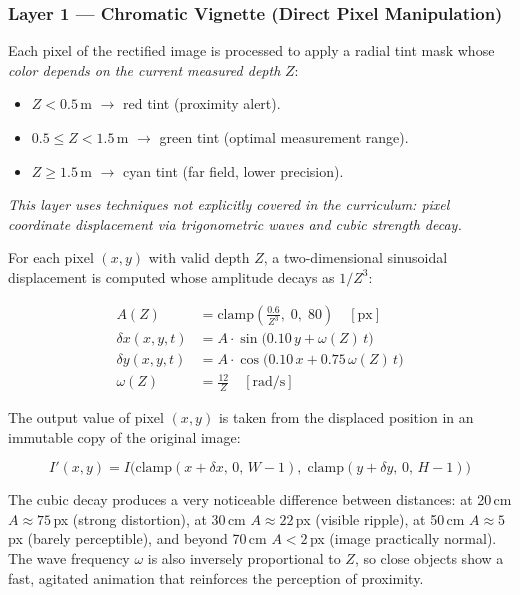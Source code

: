\documentclass[12pt, a4paper]{article}
\begin{document}
\subsubsection*{Layer 1 --- Chromatic Vignette (Direct Pixel Manipulation)}

Each pixel of the rectified image is processed to apply a radial tint mask whose
\emph{color depends on the current measured depth} $Z$:

\begin{itemize}[leftmargin=2em]
  \item $Z < 0.5$\,m $\to$ red tint (proximity alert).
  \item $0.5 \leq Z < 1.5$\,m $\to$ green tint (optimal measurement range).
  \item $Z \geq 1.5$\,m $\to$ cyan tint (far field, lower precision).
\end{itemize}

\emph{This layer uses techniques not explicitly covered in the curriculum: pixel
coordinate displacement via trigonometric waves and cubic strength decay.}

For each pixel $(x,y)$ with valid depth $Z$, a two-dimensional sinusoidal
displacement is computed whose amplitude decays as $1/Z^3$:

\begin{equation}
\label{eq:distortion}
\begin{aligned}
  A(Z) &= \text{clamp}\!\left(\frac{0.6}{Z^3},\;0,\;80\right) \quad [\text{px}]\\[4pt]
  \delta x(x,y,t) &= A \cdot \sin\!\bigl(0.10\,y + \omega(Z)\,t\bigr)\\
  \delta y(x,y,t) &= A \cdot \cos\!\bigl(0.10\,x + 0.75\,\omega(Z)\,t\bigr)\\[4pt]
  \omega(Z) &= \frac{12}{Z} \quad [\text{rad/s}]
\end{aligned}
\end{equation}

The output value of pixel $(x,y)$ is taken from the displaced position in an
immutable copy of the original image:

\begin{equation}
\label{eq:warp}
  I'(x,y) = I\!\bigl(\text{clamp}(x+\delta x,\,0,\,W-1),\;
                      \text{clamp}(y+\delta y,\,0,\,H-1)\bigr)
\end{equation}

The cubic decay produces a very noticeable difference between distances:
at 20\,cm $A\approx75$\,px (strong distortion), at 30\,cm $A\approx22$\,px
(visible ripple), at 50\,cm $A\approx5$\,px (barely perceptible), and beyond
70\,cm $A<2$\,px (image practically normal). The wave frequency $\omega$ is also
inversely proportional to $Z$, so close objects show a fast, agitated animation
that reinforces the perception of proximity.
\end{document}
